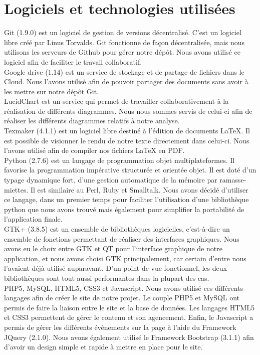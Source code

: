 \documentclass[16pts]{report}
\begin{document}
    \section{Logiciels et technologies utilisées}
    \label{sec:Logiciels et technologies utilisées}

Git (1.9.0) est un logiciel de gestion de versions décentralisé.
C'est un logiciel libre créé par Linus Torvalds.
Git fonctionne de façon décentralisée, mais nous utilisons les serveurs de 
Github pour gérer notre dépôt.
Nous avons utilisé ce logiciel afin de faciliter le travail collaboratif.
\\
Google drive (1.14) est un service de stockage et de partage de fichiers 
dans le Cloud. Nous l'avons utilisé afin de pouvoir partager des documents 
sans avoir à les mettre sur notre dépôt Git. 
\\
LucidChart est un service qui permet de travailler collaborativement à la 
réalisation de différents diagrammes. Nous nous sommes servis de celui-ci 
afin de réaliser les différents diagrammes relatifs à notre analyse.
\\
Texmaker (4.1.1) est un logiciel libre destiné à l'édition de documents 
LaTeX. Il est possible de visionner le rendu de notre texte directement dans 
celui-ci. Nous l'avons utilisé afin de compiler nos fichiers LaTeX en PDF.
\\
Python (2.7.6) est un langage de programmation objet multiplateformes. 
Il favorise la programmation impérative structurée et orientée objet. Il 
est doté d'un typage dynamique fort, d'une gestion automatique de la 
mémoire par ramasse-miettes. Il est similaire au Perl, Ruby et Smalltalk. 
Nous avons décidé d'utiliser ce langage, dans un premier temps pour 
faciliter l'utilisation d'une bibliothèque python que nous avons trouvé 
mais également pour simplifier la portabilité de l'application finale.
\\
GTK+ (3.8.5) est un ensemble de bibliothèques logicielles, c'est-à-dire 
un ensemble de fonctions permettant de réaliser des interfaces graphiques. 
Nous avons eu le choix entre GTK et QT pour l'interface graphique de notre 
application, et nous avons choisi GTK principalement, car certain 
d'entre nous l'avaient déjà utilisé auparavant. D'un point de vue 
fonctionnel, les deux bibliothèques sont tout aussi performantes dans 
la plupart des cas.
\\
PHP5, MySQL, HTML5, CSS3 et Javascript. Nous avons utilisé ces différents 
langages afin de créer le site de notre projet. Le couple PHP5 et MySQL 
ont permis de faire la liaison entre le site et la base de données. Les 
langages HTML5 et CSS3 permettent de gérer le contenu et son agencement. 
Enfin, le Javascript a permis de gérer les différents évènements sur la 
page à l'aide du Framework JQuery (2.1.0). Nous avons également utilisé 
le Framework Bootstrap (3.1.1) afin d'avoir un design simple et rapide à 
mettre en place pour le site.
\end{document}
